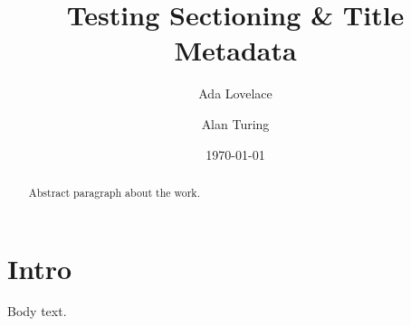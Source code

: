 \documentclass{article}
\title{Testing Sectioning \& Title Metadata}
\author{Ada Lovelace \and Alan Turing}
\date{\today}
\begin{document}
\maketitle
\begin{abstract}
Abstract paragraph about the work.
\end{abstract}
\section{Intro}
Body text.
\end{document}
